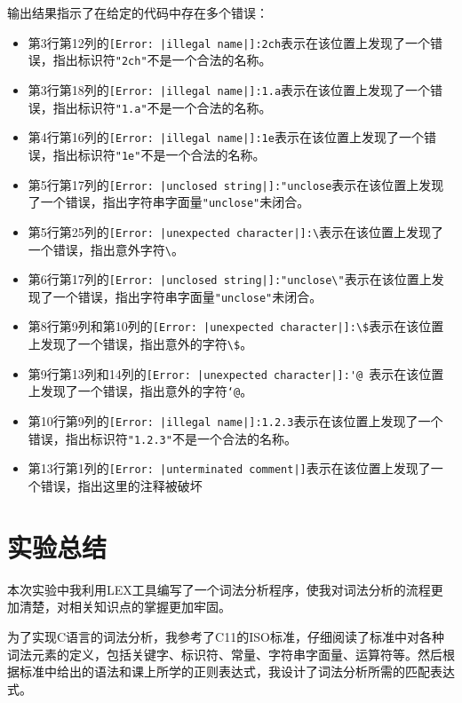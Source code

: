 \documentclass[lang=cn,11pt,a4paper]{elegantpaper}
\begin{document}
输出结果指示了在给定的代码中存在多个错误：
\begin{itemize}
    \item 第3行第12列的\lstinline[language=ErrorLanguage]{[Error: |illegal name|]:2ch}表示在该位置上发现了一个错误，指出标识符\lstinline{"2ch"}不是一个合法的名称。
    \item 第3行第18列的\lstinline[language=ErrorLanguage]{[Error: |illegal name|]:1.a}表示在该位置上发现了一个错误，指出标识符\lstinline{"1.a"}不是一个合法的名称。
    \item 第4行第16列的\lstinline[language=ErrorLanguage]{[Error: |illegal name|]:1e}表示在该位置上发现了一个错误，指出标识符\lstinline{"1e"}不是一个合法的名称。
    \item 第5行第17列的\lstinline[language=ErrorLanguage]{[Error: |unclosed string|]:"unclose}表示在该位置上发现了一个错误，指出字符串字面量\lstinline{"unclose"}未闭合。
    \item 第5行第25列的\lstinline[language=ErrorLanguage]{[Error: |unexpected character|]:\}表示在该位置上发现了一个错误，指出意外字符\lstinline{\}。
    \item 第6行第17列的\lstinline[language=ErrorLanguage]{[Error: |unclosed string|]:"unclose\"}表示在该位置上发现了一个错误，指出字符串字面量\lstinline{"unclose"}未闭合。
    \item 第8行第9列和第10列的\lstinline[language=ErrorLanguage]{[Error: |unexpected character|]:\$}表示在该位置上发现了一个错误，指出意外的字符\lstinline{\$}。
    \item 第9行第13列和14列的\lstinline[language=ErrorLanguage]{[Error: |unexpected character|]:'@ }表示在该位置上发现了一个错误，指出意外的字符\lstinline{‘@}。
    \item 第10行第9列的\lstinline[language=ErrorLanguage]{[Error: |illegal name|]:1.2.3}表示在该位置上发现了一个错误，指出标识符\lstinline{"1.2.3"}不是一个合法的名称。
    \item 第13行第1列的\lstinline[language=ErrorLanguage]{[Error: |unterminated comment|]}表示在该位置上发现了一个错误，指出这里的注释被破坏
\end{itemize}

\section{实验总结}

本次实验中我利用LEX工具编写了一个词法分析程序，使我对词法分析的流程更加清楚，对相关知识点的掌握更加牢固。

为了实现C语言的词法分析，我参考了C11的ISO标准，仔细阅读了标准中对各种词法元素的定义，包括关键字、标识符、常量、字符串字面量、运算符等。然后根据标准中给出的语法和课上所学的正则表达式，我设计了词法分析所需的匹配表达式。
\end{document}
